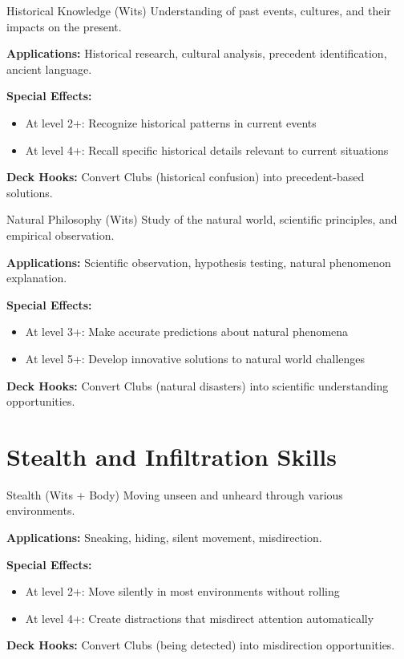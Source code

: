 \documentclass[11pt]{report}
\begin{document}
\begin{skillbox}{Historical Knowledge (Wits)}
Understanding of past events, cultures, and their impacts on the present.

\textbf{Applications:} Historical research, cultural analysis, precedent identification, ancient language.

\textbf{Special Effects:}
\begin{itemize}
    \item At level 2+: Recognize historical patterns in current events
    \item At level 4+: Recall specific historical details relevant to current situations
\end{itemize}

\textbf{Deck Hooks:} Convert Clubs (historical confusion) into precedent-based solutions.
\end{skillbox}

\begin{skillbox}{Natural Philosophy (Wits)}
Study of the natural world, scientific principles, and empirical observation.

\textbf{Applications:} Scientific observation, hypothesis testing, natural phenomenon explanation.

\textbf{Special Effects:}
\begin{itemize}
    \item At level 3+: Make accurate predictions about natural phenomena
    \item At level 5+: Develop innovative solutions to natural world challenges
\end{itemize}

\textbf{Deck Hooks:} Convert Clubs (natural disasters) into scientific understanding opportunities.
\end{skillbox}

\section{Stealth and Infiltration Skills}

\begin{skillbox}{Stealth (Wits + Body)}
Moving unseen and unheard through various environments.

\textbf{Applications:} Sneaking, hiding, silent movement, misdirection.

\textbf{Special Effects:}
\begin{itemize}
    \item At level 2+: Move silently in most environments without rolling
    \item At level 4+: Create distractions that misdirect attention automatically
\end{itemize}

\textbf{Deck Hooks:} Convert Clubs (being detected) into misdirection opportunities.
\end{skillbox}
\end{document}
